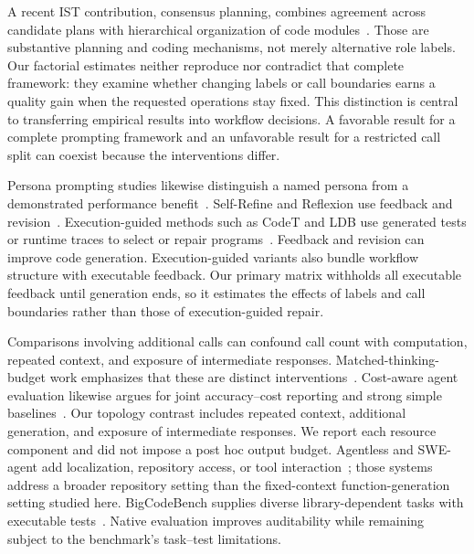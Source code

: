 A recent IST contribution, consensus planning, combines agreement across candidate plans with hierarchical organization of code modules~\cite{wen2026consensus}. Those are substantive planning and coding mechanisms, not merely alternative role labels. Our factorial estimates neither reproduce nor contradict that complete framework: they examine whether changing labels or call boundaries earns a quality gain when the requested operations stay fixed. This distinction is central to transferring empirical results into workflow decisions. A favorable result for a complete prompting framework and an unfavorable result for a restricted call split can coexist because the interventions differ.



Persona prompting studies likewise distinguish a named persona from a demonstrated performance benefit~\cite{zheng2024personas,araujo2025personas}. Self-Refine and Reflexion use feedback and revision~\cite{madaan2023selfrefine,shinn2023reflexion}. Execution-guided methods such as CodeT and LDB use generated tests or runtime traces to select or repair programs~\cite{chen2023codet,zhong2024ldb}. Feedback and revision can improve code generation. Execution-guided variants also bundle workflow structure with executable feedback. Our primary matrix withholds all executable feedback until generation ends, so it estimates the effects of labels and call boundaries rather than those of execution-guided repair.

Comparisons involving additional calls can confound call count with computation, repeated context, and exposure of intermediate responses. Matched-thinking-budget work emphasizes that these are distinct interventions~\cite{tran2026budget}. Cost-aware agent evaluation likewise argues for joint accuracy--cost reporting and strong simple baselines~\cite{kapoor2025agents}. Our topology contrast includes repeated context, additional generation, and exposure of intermediate responses. We report each resource component and did not impose a post hoc output budget. Agentless and SWE-agent add localization, repository access, or tool interaction~\cite{xia2025agentless,yang2024sweagent}; those systems address a broader repository setting than the fixed-context function-generation setting studied here. BigCodeBench supplies diverse library-dependent tasks with executable tests~\cite{zhuo2024bigcodebench}. Native evaluation improves auditability while remaining subject to the benchmark's task--test limitations.


